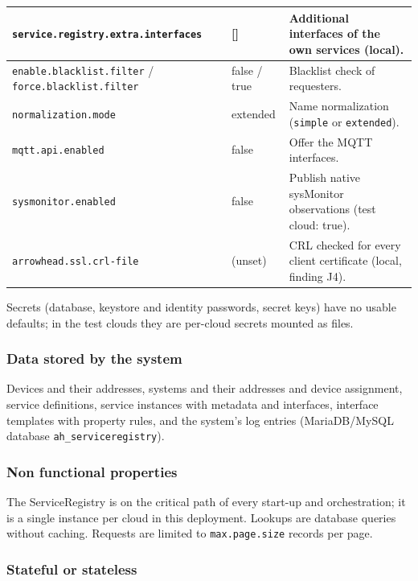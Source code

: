 \documentclass[a4paper]{arrowhead}
\begin{document}
\begin{longtable}{| p{5.4cm} | p{3.4cm} | p{6.4cm} |}
\texttt{service.\allowbreak{}registry.\allowbreak{}extra.\allowbreak{}interfaces} & [] & Additional interfaces of the own services (local). \\ \hline
\texttt{enable.\allowbreak{}blacklist.\allowbreak{}filter} / \texttt{force.\allowbreak{}blacklist.\allowbreak{}filter} & false / true & Blacklist check of requesters. \\ \hline
\texttt{normalization.\allowbreak{}mode} & extended & Name normalization (\texttt{simple} or \texttt{extended}). \\ \hline
\texttt{mqtt.\allowbreak{}api.\allowbreak{}enabled} & false & Offer the MQTT interfaces. \\ \hline
\texttt{sysmonitor.\allowbreak{}enabled} & false & Publish native sysMonitor observations (test cloud: true). \\ \hline
\texttt{arrowhead.\allowbreak{}ssl.\allowbreak{}crl-\allowbreak{}file} & (unset) & CRL checked for every client certificate (local, finding J4). \\ \hline
\end{longtable}

Secrets (database, keystore and identity passwords, secret keys) have no usable defaults; in the test clouds they are per-cloud secrets mounted as files.

\subsubsection{Data stored by the system}

Devices and their addresses, systems and their addresses and device assignment, service definitions, service instances with metadata and interfaces, interface templates with property rules, and the system's log entries (MariaDB/MySQL database \texttt{ah\_\allowbreak{}serviceregistry}).

\subsubsection{Non functional properties}

The ServiceRegistry is on the critical path of every start-up and orchestration; it is a single instance per cloud in this deployment. Lookups are database queries without caching. Requests are limited to \texttt{max.\allowbreak{}page.\allowbreak{}size} records per page.

\subsubsection{Stateful or stateless}
\end{document}
